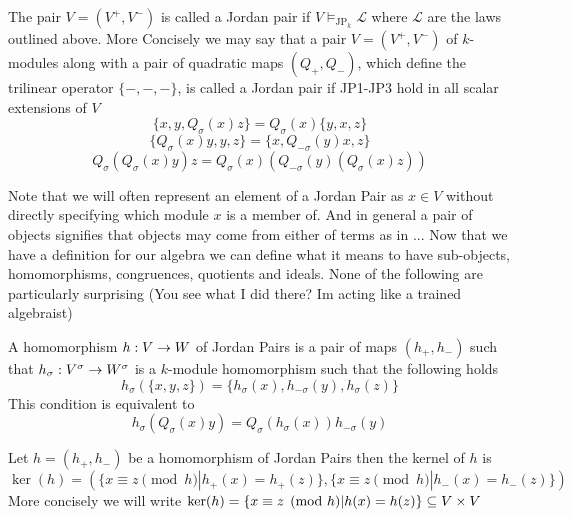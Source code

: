 \begin{definition}
    The pair $V=(V^+,V^-)$ is called a Jordan pair if $V\vDash_{\text{JP}_k}\mathcal{L}$ where $\mathcal{L}$ 
    are the laws outlined above. More Concisely we may say that a pair $V=(V^+,V^-)$ of $k$-modules
    along with a pair of quadratic maps $(Q_+,Q_-)$, which define the trilinear operator $\{-,-,-\}$, 
    is called a Jordan pair if JP1-JP3 hold in all scalar extensions of $V$
    \begin{equation}
        \tag{JP1}
        \{x,y,Q_\sigma(x)z\}=Q_\sigma(x)\{y,x,z\}
    \end{equation}
    \begin{equation}
        \tag{JP2}
        \{Q_\sigma(x)y,y,z\}=\{x,Q_{-\sigma}(y)x,z\}
    \end{equation}
    \begin{equation}
        \tag{JP3}
        Q_{\sigma}(Q_{\sigma}(x)y)z=Q_{\sigma}(x)(Q_{-\sigma}(y)(Q_{\sigma}(x)z))
    \end{equation}
\end{definition}
Note that we will often represent an element of a Jordan Pair as $x\in V$ without directly 
specifying which module $x$ is a member of. And in general a pair of objects signifies that 
objects may come from either of terms as in ...
Now that we have a definition for our algebra we can define what it means to have sub-objects, 
homomorphisms, congruences, quotients and ideals. None of the following are particularly surprising (You see what I did there? Im acting like a trained algebraist)
\begin{definition}
    A homomorphism $h:V\rightarrow W$ of Jordan Pairs is a pair of maps $(h_+,h_-)$ such that $h_\sigma:V^\sigma\rightarrow W^\sigma$ is a 
    $k$-module homomorphism such that the following holds
    \begin{equation}
        h_{\sigma}(\{x,y,z\})=\{h_{\sigma}(x),h_{-\sigma}(y),h_{\sigma}(z)\}
    \end{equation}
    This condition is equivalent to 
    \begin{equation}
        h_{\sigma}(Q_{\sigma}(x)y)=Q_{\sigma}(h_{\sigma}(x))h_{-\sigma}(y)
    \end{equation}
\end{definition}


\begin{definition}
    Let $h=(h_+,h_-)$ be a homomorphism of Jordan Pairs then the kernel of $h$ is 
    $\ker(h)=(\{x\equiv z \pmod h | h_+(x)=h_+(z)\},\{x\equiv z \pmod h | h_-(x)=h_-(z)\})$
    More concisely we will write $\ker(h)=\{x\equiv z \pmod h | h(x)=h(z)\}\subseteq V\times V$
\end{definition}

